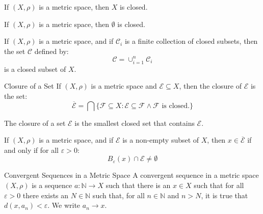 \documentclass[crop=false,class=book,oneside]{standalone}
\begin{document}
            \begin{theorem}
                If $(X,\rho)$ is a metric space, then $X$ is closed.
            \end{theorem}
            \begin{theorem}
                If $(X,\rho)$ is a metric space, then
                $\emptyset$ is closed.
            \end{theorem}
            \begin{theorem}
                If $(X,\rho)$ is a metric space, and if
                $\mathcal{C}_{i}$ is a finite collection of
                closed subsets, then the set
                $\mathcal{C}$ defined by:
                \begin{equation}
                    \mathcal{C}=\cup_{i=1}^{n}\mathcal{C}_{i}
                \end{equation}
                is a closed subset of $X$.
            \end{theorem}
            \begin{ldefinition}{Closure of a Set}
                If $(X,\rho)$ is a metric space and
                $\mathcal{E}\subseteq{X}$, then the closure
                of $\mathcal{E}$ is the set:
                \begin{equation}
                    \overline{\mathcal{E}}=
                    \bigcap\{\mathcal{F}\subseteq{X}:
                        \mathcal{E}\subseteq\mathcal{F}
                        \land\mathcal{F}\textrm{ is closed.}\}
                \end{equation}
            \end{ldefinition}
            The closure of a set $\mathcal{E}$ is the
            smallest closed set that contains $\mathcal{E}$.
            \begin{theorem}
                If $(X,\rho)$ is a metric space, and if
                $\mathcal{E}$ is a non-empty subset of $X$, then
                $x\in\overline{\mathcal{E}}$ if and only if for
                all $\varepsilon>0$:
                \begin{equation}
                    B_{\varepsilon}(x)\cap\mathcal{E}\ne\emptyset
                \end{equation}
            \end{theorem}
            \begin{ldefinition}
                  {Convergent Sequences in a Metric Space}
                A convergent sequence in a metric space
                $(X,\rho)$ is a sequence
                $a:\mathbb{N}\rightarrow{X}$ such that there is
                an $x\in{X}$ such that for all $\varepsilon>0$
                there exists an $N\in\mathbb{N}$ such that, for
                all $n\in\mathbb{N}$ and $n>N$, it is true that
                $d(x,a_{n})<\varepsilon$. We write
                $a_{n}\rightarrow{x}$.
            \end{ldefinition}
\end{document}
